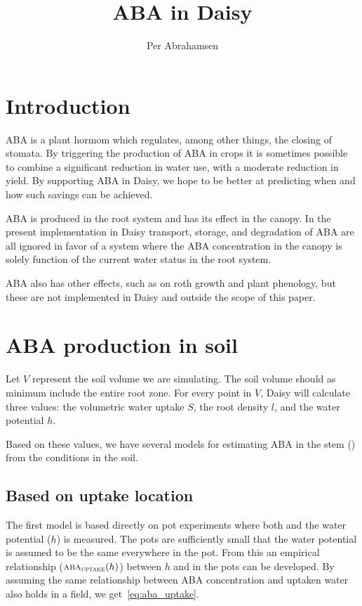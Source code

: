 \documentclass[a4paper,11pt,twoside]{article}
\newcommand{\aba}[1]{\text{\textsc{aba}$_\text{\textsc{#1}}$}}
\begin{document}
\title{ABA in Daisy}
\author{Per Abrahamsen}
\maketitle

\section{Introduction}

ABA is a plant hormom which regulates, among other things, the closing
of stomata.  By triggering the production of ABA in crops it is
sometimes possible to combine a significant reduction in water use,
with a moderate reduction in yield.  By supporting ABA in Daisy, we
hope to be better at predicting when and how such savings can be
achieved.

ABA is produced in the root system and has its effect in the canopy.
In the present implementation in Daisy transport, storage, and
degradation of ABA are all ignored in favor of a system where the ABA
concentration in the canopy is solely function of the current water
status in the root system.

ABA also has other effects, such as on roth growth and plant
phenology, but these are not implemented in Daisy and outside the
scope of this paper.

\section{ABA production in soil}

Let $V$ represent the soil volume we are simulating.  The soil volume
should as minimum include the entire root zone.  For every point in
$V$, Daisy will calculate three values: the volumetric water uptake
$S$, the root density $l$, and the water potential $h$.

Based on these values, we have several models for estimating ABA in
the stem (\aba{xylem}) from the conditions in the soil.

\subsection{Based on uptake location}

The first model is based directly on pot experiments where both
\aba{xylem} and the water potential ($h$) is measured.  The pots are
sufficiently small that the water potential is assumed to be the same
everywhere in the pot.  From this an empirical relationship
($\aba{uptake}(h)$) between $h$ and \aba{xylem} in the pots can be
developed.  By assuming the same relationship between ABA
concentration and uptaken water also holds in a field, we
get~\eqref{eq:aba_uptake}.
\end{document}
